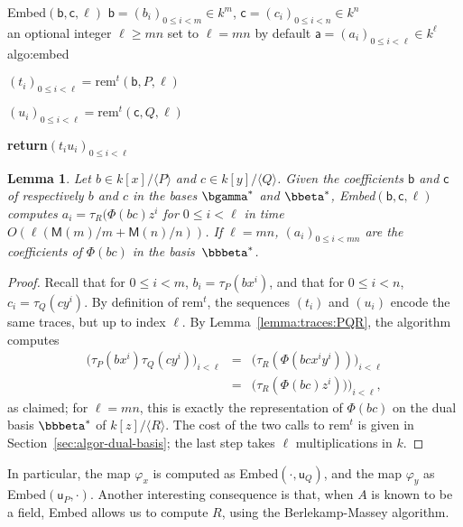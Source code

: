 \documentclass{sig-alternate}
\def\M {\ensuremath{\mathsf{M}}}
\def\va {\ensuremath{\mathsf{a}}}
\def\vu {\ensuremath{\mathsf{u}}}
\def\vb {\ensuremath{\mathsf{b}}}
\def\vc {\ensuremath{\mathsf{c}}}
\def\rem {\ensuremath{\mathrm{rem}}}
\newcounter{algo}
\newenvironment{algorithm_endline}[4]{\small\begin{center}\begin{minipage}{0.48\textwidth}
      \refstepcounter{algo}
      \label{#4}
      \sf
      \rule{\textwidth}{0.2pt}\\
      \makebox[\textwidth][c]{Algorithm~\arabic{algo}:~\textbf{#1}}\\
      \rule[0.5\baselineskip]{\textwidth}{0.2pt}\\

      \vspace{-12pt}

      \parbox{\textwidth}{\textbf{Input} #2}
      \parbox{\textwidth}{\textbf{Output} #3}

\vspace{-7pt}

      \begin{enumerate*}}{\end{enumerate*}
      \vspace{-11pt}
      \rule{\textwidth}{0.2pt}
\end{minipage}\end{center}
}
\newcommand{\ang}[1]{\langle#1\rangle}
\newtheorem{Lemma}{Lemma}
\begin{document}
\vspace{-5pt}

\begin{algorithm_endline}
{Embed$(\vb,\vc,\ell)$}
{$\vb=(b_i)_{0 \le i < m} \in k^m$, $\vc=(c_i)_{0 \le i < n} \in k^n$\\
    an optional integer $\ell \ge mn$ set to $\ell=mn$ by default}
{$\va=(a_i)_{0 \le i < \ell} \in k^{\ell}$}
{algo:embed}
\item $(t_i)_{0\le i<\ell} = \rem^t(\vb,P,\ell)$
\item $(u_i)_{0\le i<\ell} = \rem^t(\vc,Q,\ell)$
\item {\bf return}$(t_i u_i)_{0 \le i <\ell}$
\end{algorithm_endline}

\begin{Lemma}\label{lemma:algo:embed}
  Let $b \in k[x]/\ang{P}$ and $c \in k[y]/\ang{Q}$.  Given the
  coefficients $\vb$ and $\vc$ of respectively $b$ and $c$ in the
  bases $\bgamma^\ast$ and $\bbeta^\ast$, {\em Embed}$(\vb,\vc,\ell)$
  computes $a_i=\tau_R(\Phi(bc)z^i$ for $0 \le i < \ell$ in time
  $O(\ell(\M(m)/m+\M(n)/n))$. If $\ell=mn$, $(a_i)_{0 \le i < mn}$ are
  the coefficients of $\Phi(bc)$ in the basis~$\bbbeta^\ast$.
\end{Lemma}
\begin{proof}
  Recall that for $0 \le i <m$, $b_i = \tau_P(bx^i)$, and that for $0
  \le i < n$, $c_i = \tau_Q(cy^i)$. By definition of $\rem^t$, the
  sequences $(t_i)$ and $(u_i)$ encode the same traces, but up to
  index $\ell$.  By Lemma~\ref{lemma:traces:PQR}, the algorithm
  computes
  \begin{eqnarray*}
    \bigl(\tau_P(bx^i)\tau_Q(cy^i)\bigr)_{i<\ell} &=&  \bigl(\tau_R(\Phi(bc x^i y^i))\bigr)_{i<\ell}\\
    &=&  \bigl(\tau_R(\Phi(bc) z^i))\bigr)_{i<\ell},
  \end{eqnarray*}
  as claimed; for $\ell=mn$, this is exactly the representation of
  $\Phi(bc)$ on the dual basis $\bbbeta^\ast$ of $k[z]/\ang{R}$. The
  cost of the two calls to $\rem^t$ is given in
  Section~\ref{sec:algor-dual-basis}; the last step takes $\ell$
  multiplications in $k$.
\end{proof}

In particular, the map $\varphi_x$ is computed as
Embed$(\cdot,\vu_Q)$, and the map $\varphi_y$ as
Embed$(\vu_P,\cdot)$. Another interesting consequence is that, when
$A$ is known to be a field, Embed allows us to compute $R$, using the
Berlekamp-Massey algorithm.
\end{document}

